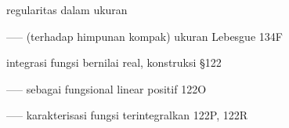 







































\indexmedskip

































regularitas dalam ukuran



----- (terhadap himpunan kompak) ukuran Lebesgue 134F

















integrasi fungsi bernilai real, konstruksi \S122

----- sebagai fungsional linear positif 122O





----- karakterisasi fungsi terintegralkan 122P, 122R



